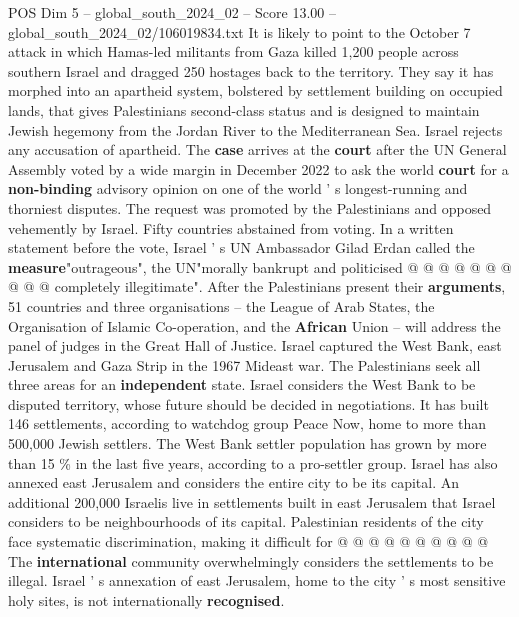 \begin{textsample}{POS Dim 5 – global\_south\_2024\_02 – Score 13.00 – global\_south\_2024\_02/106019834.txt}
It is likely to point to the October 7 attack in which Hamas-led militants from Gaza killed 1,200 people across southern Israel and dragged 250 hostages back to the territory.
They say it has morphed into an apartheid system, bolstered by settlement building on occupied lands, that gives Palestinians second-class status and is designed to maintain Jewish hegemony from the Jordan River to the Mediterranean Sea.
Israel rejects any accusation of apartheid.
The \textbf{case} arrives at the \textbf{court} after the UN General Assembly voted by a wide margin in December 2022 to ask the world \textbf{court} for a \textbf{non-binding} advisory opinion on one of the world ' s longest-running and thorniest disputes.
The request was promoted by the Palestinians and opposed vehemently by Israel.
Fifty countries abstained from voting.
In a written statement before the vote, Israel ' s UN Ambassador Gilad Erdan called the \textbf{measure}"outrageous", the UN"morally bankrupt and politicised @ @ @ @ @ @ @ @ @ @ completely illegitimate".
After the Palestinians present their \textbf{arguments}, 51 countries and three organisations -- the League of Arab States, the Organisation of Islamic Co-operation, and the \textbf{African} Union -- will address the panel of judges in the Great Hall of Justice.
Israel captured the West Bank, east Jerusalem and Gaza Strip in the 1967 Mideast war.
The Palestinians seek all three areas for an \textbf{independent} state.
Israel considers the West Bank to be disputed territory, whose future should be decided in negotiations.
It has built 146 settlements, according to watchdog group Peace Now, home to more than 500,000 Jewish settlers.
The West Bank settler population has grown by more than 15 \% in the last five years, according to a pro-settler group.
Israel has also annexed east Jerusalem and considers the entire city to be its capital.
An additional 200,000 Israelis live in settlements built in east Jerusalem that Israel considers to be neighbourhoods of its capital.
Palestinian residents of the city face systematic discrimination, making it difficult for @ @ @ @ @ @ @ @ @ @ The \textbf{international} community overwhelmingly considers the settlements to be illegal.
Israel ' s annexation of east Jerusalem, home to the city ' s most sensitive holy sites, is not internationally \textbf{recognised}.

\end{textsample}
